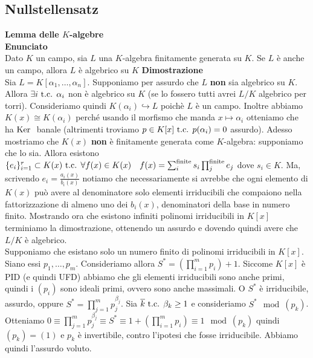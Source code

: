 \documentclass[a4paper,NoNotes,GeneralMath]{stdmdoc}
\newcommand{\Enunciato}{\vskip 0.05cm \noindent \textbf{Enunciato} \\ }
\renewcommand{\Dimostrazione}{\vskip 0.05cm \noindent \textbf{Dimostrazione} \\ }
\renewcommand{\bar}{\overline}
\newcommand{\ims}{\hookrightarrow}
\begin{document}
	\subsection{Nullstellensatz}
	{\bf Lemma delle $K$-algebre} \\
	\Enunciato Dato $K$ un campo, sia $L$ una $K$-algebra finitamente generata su $K$. Se $L$ è anche un campo, allora $L$ è algebrico su $K$
	\Dimostrazione Sia $L = K[\alpha_1, \ldots, \alpha_n]$. Supponiamo per assurdo che $L$ {\bf non} sia algebrico su $K$. Allora $\exists i \mbox{ t.c. } \alpha_i$ non è algebrico su $K$ (se lo fossero tutti avrei $L/K$ algebrico per torri). Consideriamo quindi $K(\alpha_i) \ims L$ poichè $L$ è un campo. Inoltre abbiamo $K(x) \cong K(\alpha_i)$ perché usando il morfismo che manda $x \mapsto \alpha_i$ otteniamo che ha $\mbox{Ker }$ banale (altrimenti troviamo $p \in K[x] \mbox{ t.c. } p(\alpha_i) = 0$ assurdo). Adesso mostriamo che $K(x)$ {\bf non} è finitamente generata come $K$-algebra: supponiamo che lo sia. Allora esistono $\{e_i\}_{i=1}^{r} \subset K(x) \mbox{ t.c. } \forall f(x) \in K(x) \quad f(x) = \sum_{i}^{\text{finite}} s_i \prod_{j}^{\text{finite}} e_j$ dove $s_i \in K$. Ma, scrivendo $e_i = \frac{a_i(x)}{b_i(x)}$ notiamo che necessariamente si avrebbe che ogni elemento di $K(x)$ può avere al denominatore solo elementi irriducibili che compaiono nella fattorizzazione di almeno uno dei $b_i(x)$, denominatori della base in numero finito. Mostrando ora che esistono infiniti polinomi irriducibili in $K[x]$ terminiamo la dimostrazione, ottenendo un assurdo e dovendo quindi avere che $L/K$ è algebrico. \\
	Supponiamo che esistano solo un numero finito di polinomi irriducibili in $K[x]$. Siano essi $p_1, \ldots, p_m$. Consideriamo allora $S^{*} = \left( \prod_{i=1}^{m} p_i \right) + 1$. Siccome $K[x]$ è PID (e quindi UFD) abbiamo che gli elementi irriducibili sono anche primi, quindi i $(p_i)$ sono ideali primi, ovvero sono anche massimali. O $S^{*}$ è irriducibile, assurdo, oppure $S^{*} = \prod_{j=1}^{m} p_j^{\beta_j}$. Sia $\bar{k} \tc \beta_k \ge 1$ e consideriamo $S^{*} \mod (p_k)$. Otteniamo $0 \equiv \prod_{j=1}^m p_j^{\beta_j} \equiv S^{*} \equiv 1 + \left( \prod_{i=1}^m p_i \right) \equiv 1 \mod (p_k)$ quindi $(p_k) = (1)$ e $p_k$ è invertibile, contro l'ipotesi che fosse irriducibile. Abbiamo quindi l'assurdo voluto. \\
	
\end{document}
